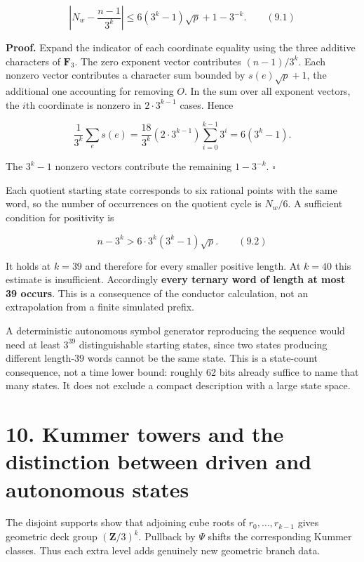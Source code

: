 \documentclass[
  11pt,
  a4paper,
]{article}
\begin{document}
\[
\left|N_w-\frac{n-1}{3^k}\right|
\leq6(3^k-1)\sqrt p+1-3^{-k}. \qquad (9.1)
\]

\textbf{Proof.} Expand the indicator of each coordinate equality using
the three additive characters of \(\mathbf F_3\). The zero exponent
vector contributes \((n-1)/3^k\). Each nonzero vector contributes a
character sum bounded by \(s(e)\sqrt p+1\), the additional one
accounting for removing \(O\). In the sum over all exponent vectors, the
\(i\)th coordinate is nonzero in \(2\cdot3^{k-1}\) cases. Hence

\[
\frac1{3^k}\sum_e s(e)
=\frac{18}{3^k}(2\cdot3^{k-1})\sum_{i=0}^{k-1}3^i
=6(3^k-1).
\]

The \(3^k-1\) nonzero vectors contribute the remaining \(1-3^{-k}\).
\(\square\)

Each quotient starting state corresponds to six rational points with the
same word, so the number of occurrences on the quotient cycle is
\(N_w/6\). A sufficient condition for positivity is

\[
n-3^k>6\cdot3^k(3^k-1)\sqrt p. \qquad (9.2)
\]

It holds at \(k=39\) and therefore for every smaller positive length. At
\(k=40\) this estimate is insufficient. Accordingly \textbf{every
ternary word of length at most 39 occurs}. This is a consequence of the
conductor calculation, not an extrapolation from a finite simulated
prefix.

A deterministic autonomous symbol generator reproducing the sequence
would need at least \(3^{39}\) distinguishable starting states, since
two states producing different length-39 words cannot be the same state.
This is a state-count consequence, not a time lower bound: roughly 62
bits already suffice to name that many states. It does not exclude a
compact description with a large state space.

\section{10. Kummer towers and the distinction between driven and
autonomous
states}\label{kummer-towers-and-the-distinction-between-driven-and-autonomous-states}

The disjoint supports show that adjoining cube roots of
\(r_0,\ldots,r_{k-1}\) gives geometric deck group \((\mathbf Z/3)^k\).
Pullback by \(\Psi\) shifts the corresponding Kummer classes. Thus each
extra level adds genuinely new geometric branch data.
\end{document}
